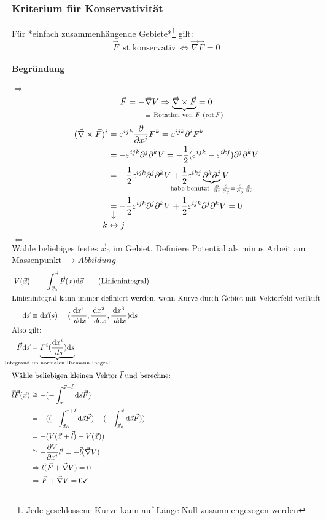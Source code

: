 \documentclass[a4paper]{scrartcl}
\DeclareMathOperator{\rot}{rot}
\renewcommand{\d}{\mathrm{d}}
\newcommand{\dd}[2]{\frac{\d #1}{\ d#2}}
\renewcommand{\v}[1]{\vec{#1}}
\theoremstyle{definition}
\theoremstyle{plain}
\theoremstyle{remark}
\begin{document}
\subsubsection{Kriterium für Konservativität}
\label{sec-4-3-2}
Für *einfach zusammenhängende Gebiete*\footnote{Jede geschlossene Kurve kann auf Länge Null zusammengezogen werden} gilt:
\[\v F ~\text{ist konservativ}~ \Leftrightarrow \v\nabla\v F = 0\]
\paragraph{Begründung}
\label{sec-4-3-2-1}
$\Rightarrow$ \\ \[\v F = -\v\nabla V \Rightarrow \underbrace{\v\nabla\times\v F}_{\mathclap{\equiv~\text{Rotation von $F$ ($\rot{F}$)}}} = 0\]
\begin{align*}
(\v\nabla\times\v F)^i &= \varepsilon^{ijk} \frac{\partial}{\partial x^j} F^k = \varepsilon^{ijk}\partial^i F^k \\
&= -\varepsilon^{ijk}\partial^j\partial^k V = -\frac{1}{2}(\varepsilon^{ijk} -\varepsilon^{ikj})\partial^j\partial^k V \\
&= - \frac{1}{2}\varepsilon^{ijk}\partial^j \partial^k V + \frac{1}{2}\varepsilon^{ikj}\underbrace{\partial^k\partial^j}_{\mathclap{\text{habe benutzt}~\frac{\partial}{\partial x}\frac{\partial}{\partial y} = \frac{\partial}{\partial y}\frac{\partial}{\partial x}}} V \\
&\underarrow[=]{$k \leftrightarrow j$} -\frac{1}{2}\varepsilon^{ijk}\partial^j\partial^k V + \frac{1}{2}\varepsilon^{ijk}\partial^j\partial^k V = 0
\end{align*}
$\Leftarrow$ \\
     Wähle beliebiges festes $\v x_0$ im Gebiet. Definiere Potential als minus Arbeit am Massenpunkt $\rightarrow Abbildung$
\begin{align*}
V(\v x) &\equiv -\int_{\v x_0}^{\v x} \v F(x)\d\v s \tag{Linienintegral} \\
\intertext{Linienintegral kann immer definiert werden, wenn Kurve durch Gebiet mit Vektorfeld verläuft}
\d\v s &\equiv \d\v x(s) =(\dd{x^1}{\d x}, \dd{x^2}{\d x}, \dd{x^3}{\d x}) \d s \\
\intertext{Also gilt:}
\v F\d\v s &= \underbrace{F^i (\dd{x^i}{s})\d s}_{\mathclap{\text{Integrand im normalen Riemann Inegral}}} \\
\intertext{Wähle beliebigen kleinen Vektor $\v l$ und berechne:}
\v l \v F(\v x) &\cong -(-\int_{\v x}^{\v x + \v l} \d\v s \v F) \\
&= -((-\int_{\v x_0}^{\v x + \v l} \d \v s \v F) - ( -\int_{\v x_0}^{\v x} \d\v s \v F)) \\
&= -(V(\v x + \v l) -V(\v x)) \\
&\cong - \frac{\partial V}{\partial x^i}l^i = -\v l(\v\nabla V) \\
&\Rightarrow \v l(\v F + \v\nabla V) = 0 \\
&\Rightarrow \v F + \v\nabla V = 0 \checkmark
\end{align*}
\end{document}
